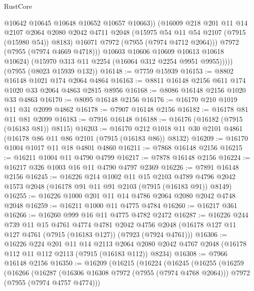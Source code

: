 \begin{lexlean}{RustCore}
\begin{coremodule}
                  @10642
                  @10645
                  @10648
                  @10652
                  @10657
                  @10663))
              (@16009
                @218
                @201
                @11
                @14
                @2107
                @2064
                @2080
                @2042
                @4711
                @2048
                (@15975 @54 @11 @54 @2107 (@7915 (@15980 @54)) @8183)
                @16071
                @7972
                (@7955 (@7974 @4712 @2064)))
              @7972
              (@7955 (@7974 @4669 @4718)))
            @10603
            @10606
            @10609
            @10613
            @10618
            @10624)
          (@15970 @313 @11 @2254 (@16064 @312 @2254 @9951 @9955)))))
    (@7955 (@8023 @15939 @132))
@16148 := @7759 @15939
@16153 := @8802 @16148 @1021 @174 @2064 @4864
@16163 := @8811 @16148 @2156 @611 @174 @1020 @33 @2064 @4863 @2815 @8956
@16168 := @8086 @16148 @2156 @1020 @33 @4863
@16170 := @8095 @16148 @2156
@16176 := @16170 @210 @1019 @11 @31 @2099 @4862
@16178 := @7907 @16148 @2156
@16182 := @16178 @81 @11 @81 @2099
@16183 := @7916 @16148
@16188 := @16176 (@16182 (@7915 (@16183 @81)) @8115)
@16203 := @16170
    @212
    @1018
    @11
    @30
    @2101
    @4861
    (@16178 @86 @11 @86 @2101 (@7915 (@16183 @86)) @8132)
@16209 := @16170 @1004 @1017 @11 @18 @4801 @4860
@16211 := @7868 @16148 @2156
@16215 := @16211 @1004 @11 @4790 @4799
@16217 := @7878 @16148 @2156
@16224 := @16217 @326 @1003 @16 @11 @4790 @4797 @2369
@16226 := @7891 @16148 @2156
@16245 := @16226
    @214
    @1002
    @11
    @15
    @2103
    @4789
    @4796
    @2042
    @1573
    @2048
    (@16178 @91 @11 @91 @2103 (@7915 (@16183 @91)) @8149)
@16255 := @16226 @1000 @201 @11 @14 @4786 @2064 @2080 @2042 @4748 @2048
@16259 := @16211 @1000 @11 @4775 @4784
@16260 := @16217 @361
@16266 := @16260 @999 @16 @11 @4775 @4782 @2472
@16287 := @16226
    @244
    @739
    @11
    @15
    @4761
    @4774
    @4781
    @2042
    @4756
    @2048
    (@16178 @127 @11 @127 @4761 (@7915 (@16183 @127)) (@7923 (@7924 @4761)))
@16306 := @16226
    @224
    @201
    @11
    @14
    @2113
    @2064
    @2080
    @2042
    @4767
    @2048
    (@16178 @112 @11 @112 @2113 (@7915 (@16183 @112)) @8234)
@16308 := @7966 @16148 @2156
@16350 := @16209
    (@16215
      (@16224
        (@16245
          (@16255
            (@16259
              (@16266
                (@16287
                  (@16306 @16308 @7972 (@7955 (@7974 @4768 @2064)))
                  @7972
                  (@7955 (@7974 @4757 @4774)))

\end{coremodule}
\end{lexlean}
